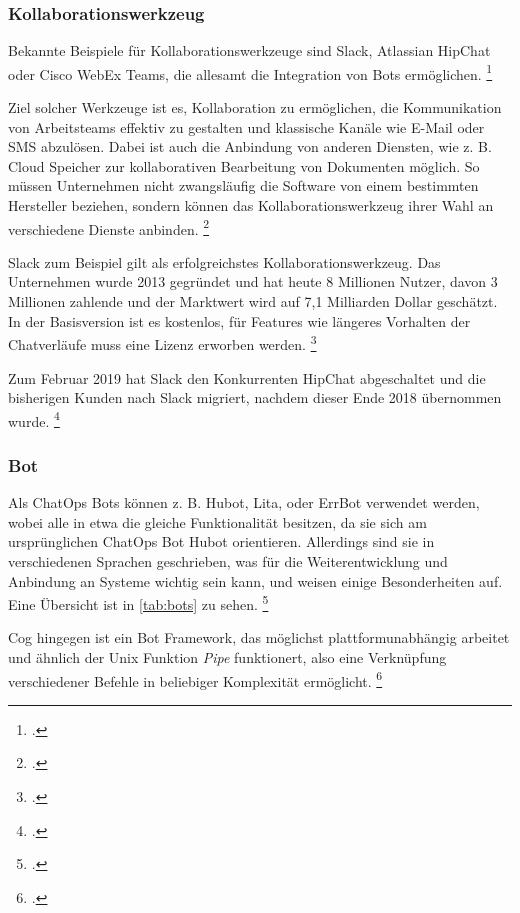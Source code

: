 \subsubsection{Kollaborationswerkzeug}
Bekannte Beispiele für Kollaborationswerkzeuge sind Slack, Atlassian HipChat oder Cisco WebEx Teams, die allesamt die Integration von Bots ermöglichen.
\footcite[Vgl.][o. \pno]{Zyane_2017_ChatOps}

Ziel solcher Werkzeuge ist es, Kollaboration zu ermöglichen, die Kommunikation von Arbeitsteams effektiv zu gestalten und klassische Kanäle wie E-Mail oder SMS abzulösen. Dabei ist auch die Anbindung von anderen Diensten, wie z. B. Cloud Speicher zur kollaborativen Bearbeitung von Dokumenten möglich. So müssen Unternehmen nicht zwangsläufig die Software von einem bestimmten Hersteller beziehen, sondern können das Kollaborationswerkzeug ihrer Wahl an verschiedene Dienste anbinden.
\footcite[Vgl.][o. \pno]{Koeltzsch_2019_Slack}

Slack zum Beispiel gilt als erfolgreichstes Kollaborationswerkzeug. Das Unternehmen wurde 2013 gegründet und hat heute 8 Millionen Nutzer, davon 3 Millionen zahlende und der Marktwert wird auf 7,1 Milliarden Dollar geschätzt. In der Basisversion ist es kostenlos, für Features wie längeres Vorhalten der Chatverläufe muss eine Lizenz erworben werden.
\footcite[Vgl.][o. \pno]{Koeltzsch_2019_Slack}

Zum Februar 2019 hat Slack den Konkurrenten HipChat abgeschaltet und die bisherigen Kunden nach Slack migriert, nachdem dieser Ende 2018 übernommen wurde.
\footcite[Vgl.][o. \pno]{Donath_2018_Hipchat_Uebernahme}

\subsubsection{Bot}
Als ChatOps Bots können z. B. Hubot, Lita, oder  ErrBot verwendet werden, wobei alle in etwa die gleiche Funktionalität besitzen, da sie sich am ursprünglichen ChatOps Bot Hubot orientieren.
Allerdings sind sie in verschiedenen Sprachen geschrieben, was für die Weiterentwicklung und Anbindung an Systeme wichtig sein kann, und weisen einige Besonderheiten auf. Eine Übersicht ist in \autoref{tab:bots} zu sehen.
\footcite[Vgl.][o. \pno]{Zyane_2017_ChatOps}

Cog hingegen ist ein Bot Framework, das möglichst plattformunabhängig arbeitet und ähnlich der Unix Funktion \textit{Pipe} funktionert, also eine Verknüpfung verschiedener Befehle in beliebiger Komplexität ermöglicht.
\footcite[Vgl.][o. \pno]{Zyane_2017_ChatOps}


